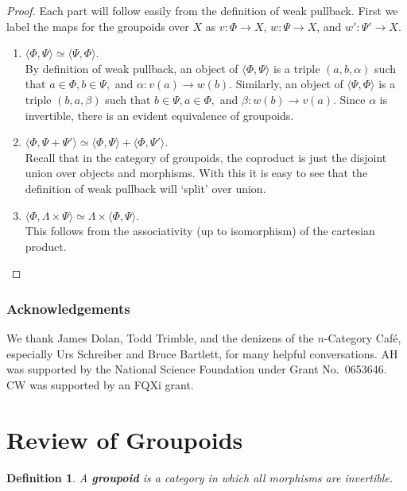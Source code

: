 \documentclass{article}
\renewcommand{\to}{\rightarrow}
\newcommand{\maps}{\colon}
\newcommand{\ip}[2]{\langle #1,#2 \rangle}
\newtheorem{definition}[thm]{Definition}
\begin{document}
\begin{proof}
Each part will follow easily from the definition of weak
pullback. First we label the maps for the groupoids over $X$ as
$v\maps\Phi\to X$, $w\maps\Psi\to X$, and $w' \maps\Psi' \to X$.

\begin{enumerate}
\item $\ip{\Phi}{\Psi} \simeq \ip{\Psi}{\Phi}.$\\ 
By definition of
weak pullback, an object of $\ip{\Phi}{\Psi}$ is a triple
$(a,b,\alpha)$ such that $a\in\Phi, b\in\Psi,$ and $\alpha\maps
v(a)\to w(b)$.  Similarly, an object of $\ip{\Psi}{\Phi}$ is a triple
$(b,a,\beta)$ such that $b\in\Psi, a\in\Phi,$ and $\beta\maps w(b) \to
v(a)$.  Since $\alpha$ is invertible, there is an evident equivalence
of groupoids.

\item $\ip{\Phi}{\Psi + \Psi'} \simeq \ip{\Phi}{\Psi} + \ip{\Phi}{\Psi'}.$\\
Recall that in the category of groupoids, the coproduct is just the
disjoint union over objects and morphisms. With this it is easy to
see that the definition of weak pullback will `split' over union. 

\item $\ip{\Phi}{\Lambda \times \Psi} \simeq \Lambda \times \ip{\Phi}{\Psi}.$\\
This follows from the associativity (up to isomorphism) of the 
cartesian product.
\end{enumerate}

\end{proof}

\subsubsection*{Acknowledgements}

We thank James Dolan, Todd Trimble, and the denizens of the
$n$-Category Caf\'e, especially Urs Schreiber and Bruce Bartlett, for
many helpful conversations.  AH was supported by the National Science
Foundation under Grant No.\ 0653646.  CW was supported by an FQXi
grant.

\appendix
\section{Review of Groupoids}\label{appendix}

\begin{definition}
A {\bf groupoid} is a category in which all morphisms are invertible.
\end{definition}
\end{document}
